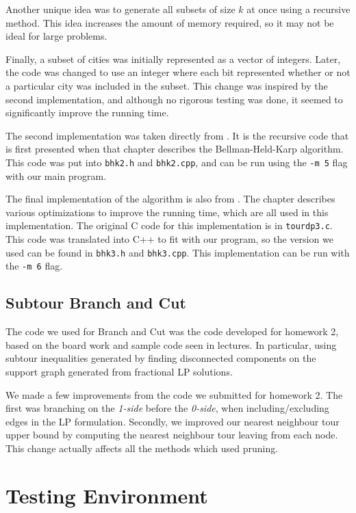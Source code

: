 \documentclass[11pt]{article}
\begin{document}
Another unique idea was to generate all subsets of size $k$ at once using a recursive method. This idea increases the amount of memory required, so it may not be ideal for large problems.

Finally, a subset of cities was initially represented as a vector of integers. Later, the code was changed to use an integer where each bit represented whether or not a particular city was included in the subset. This change was inspired by the second implementation, and although no rigorous testing was done, it seemed to significantly improve the running time.

The second implementation was taken directly from \cite{bico}. It is the recursive code that is first presented when that chapter describes the Bellman-Held-Karp algorithm. This code was put into \texttt{bhk2.h} and \texttt{bhk2.cpp}, and can be run using the \texttt{-m 5} flag with our main program.

The final implementation of the algorithm is also from \cite{bico}. The chapter describes various optimizations to improve the running time, which are all used in this implementation. The original C code for this implementation is in \texttt{tour{\textunderscore}dp3.c}. This code was translated into C++ to fit with our program, so the version we used can be found in \texttt{bhk3.h} and \texttt{bhk3.cpp}. This implementation can be run with the \texttt{-m 6} flag.

\subsection{Subtour Branch and Cut}

The code we used for Branch and Cut was the code developed for homework 2, based on the board work and sample code seen in lectures. In particular, using subtour inequalities generated by finding disconnected components on the support graph generated from fractional LP solutions.

We made a few improvements from the code we submitted for homework 2. The first was branching on the \emph{1-side} before the \emph{0-side}, when including/excluding edges in the LP formulation. Secondly, we improved our nearest neighbour tour upper bound by computing the nearest neighbour tour leaving from each node. This change actually affects all the methods which used pruning. 

\section{Testing Environment}
\label{sec:environment}
\end{document}

